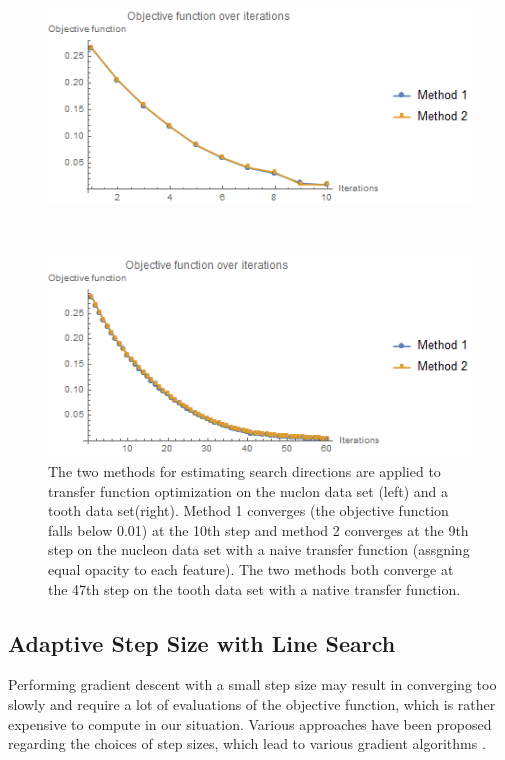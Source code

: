 \begin{figure}
	\centering
	\begin{minipage}{.49\textwidth}
		\includegraphics[width=1\linewidth]{images/nucleon_naive_rms_fixed_newton}
	\end{minipage}~
	\begin{minipage}{.49\textwidth}
		\includegraphics[width=1\linewidth]{images/tooth_naive_rms_fixed_newton}	
	\end{minipage}
	\caption{The two methods for estimating search directions are applied to transfer function optimization on the nuclon data set (left) and a tooth data set(right).
		Method 1 converges (the objective function falls below 0.01) at the 10th step and method 2 converges at the 9th step on the nucleon data set with a naive transfer function (assgning equal opacity to each feature).
		The two methods both converge at the 47th step on the tooth data set with a native transfer function.}
	\label{fig:nucleon_naive_tooth_naive_rms}
\end{figure}

\subsection{Adaptive Step Size with Line Search}
Performing gradient descent with a small step size may result in converging too slowly and require a lot of evaluations of the objective function, which is rather expensive to compute in our situation. Various approaches have been proposed regarding the choices of step sizes, which lead to various gradient algorithms \cite{yuan_step-sizes_2008}.

